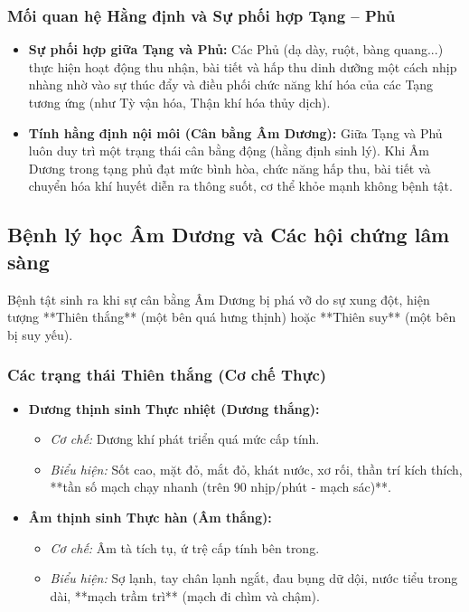 \subsubsection{Mối quan hệ Hằng định và Sự phối hợp Tạng -- Phủ}
\begin{itemize}
    \item \textbf{Sự phối hợp giữa Tạng và Phủ:} Các Phủ (dạ dày, ruột, bàng quang...) thực hiện hoạt động thu nhận, bài tiết và hấp thu dinh dưỡng một cách nhịp nhàng nhờ vào sự thúc đẩy và điều phối chức năng khí hóa của các Tạng tương ứng (như Tỳ vận hóa, Thận khí hóa thủy dịch).
    \item \textbf{Tính hằng định nội môi (Cân bằng Âm Dương):} Giữa Tạng và Phủ luôn duy trì một trạng thái cân bằng động (hằng định sinh lý). Khi Âm Dương trong tạng phủ đạt mức bình hòa, chức năng hấp thu, bài tiết và chuyển hóa khí huyết diễn ra thông suốt, cơ thể khỏe mạnh không bệnh tật.
\end{itemize}

\subsection{Bệnh lý học Âm Dương và Các hội chứng lâm sàng}

Bệnh tật sinh ra khi sự cân bằng Âm Dương bị phá vỡ do sự xung đột, hiện tượng **Thiên thắng** (một bên quá hưng thịnh) hoặc **Thiên suy** (một bên bị suy yếu).

\subsubsection{Các trạng thái Thiên thắng (Cơ chế Thực)}
\begin{itemize}
    \item \textbf{Dương thịnh sinh Thực nhiệt (Dương thắng):} 
    \begin{itemize}
        \item \textit{Cơ chế:} Dương khí phát triển quá mức cấp tính.
        \item \textit{Biểu hiện:} Sốt cao, mặt đỏ, mắt đỏ, khát nước, xơ rối, thần trí kích thích, **tần số mạch chạy nhanh (trên 90 nhịp/phút - mạch sác)**.
    \end{itemize}

    \item \textbf{Âm thịnh sinh Thực hàn (Âm thắng):} 
    \begin{itemize}
        \item \textit{Cơ chế:} Âm tà tích tụ, ứ trệ cấp tính bên trong.
        \item \textit{Biểu hiện:} Sợ lạnh, tay chân lạnh ngắt, đau bụng dữ dội, nước tiểu trong dài, **mạch trầm trì** (mạch đi chìm và chậm).
    \end{itemize}
\end{itemize}

